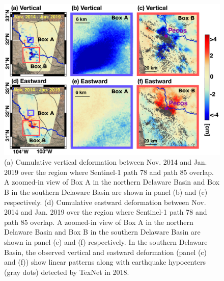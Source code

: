 \documentclass{utexasthesis}
\begin{document}
\begin{figure}[hbt!]
	\centering
	\includegraphics[width=0.96\linewidth]{paper1-permian/figures/figure4-east-vertical-6panel-labelled.pdf}
	\caption[Cumulative vertical and horizontal deformation]{(a) Cumulative vertical deformation between Nov. 2014 and Jan. 2019 over the region where Sentinel-1 path 78 and path 85 overlap. A zoomed-in view of Box A in the northern Delaware Basin and Box B in the southern Delaware Basin are shown in panel (b) and (c) respectively. (d) Cumulative eastward deformation between Nov. 2014 and Jan. 2019 over the region where Sentinel-1 path 78 and path 85 overlap. A zoomed-in view of Box A in the northern Delaware Basin and Box B in the southern Delaware Basin are shown in panel (e) and (f) respectively. In the southern Delaware Basin, the observed vertical and eastward deformation (panel (c) and (f)) show linear patterns along with earthquake hypocenters (gray dots) detected by TexNet in 2018.}
	\label{fig:insar-decomp}
\end{figure}
\end{document}
